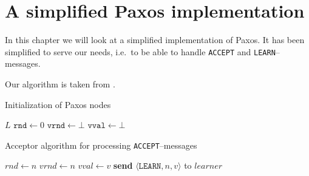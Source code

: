 \chapter{A simplified Paxos implementation}

In this chapter we will look at a simplified implementation of Paxos.
It has been simplified to serve our needs, i.e.~to be able to handle
\texttt{ACCEPT} and \texttt{LEARN}--messages.

Our algorithm is taken from \cite{Insane.Paxos}.


\begin{algorithm}
  \caption{Initialization of Paxos nodes}
  \label{paxos.algorithm.init}
  \begin{algorithmic}
    \State $L$
    \State $\texttt{rnd} \leftarrow 0$ 
    \State $\texttt{vrnd} \leftarrow \bot$ 
    \State $\texttt{vval} \leftarrow \bot$ 
  \end{algorithmic}
\end{algorithm}


\begin{algorithm}
  \caption{Acceptor algorithm for processing \texttt{ACCEPT}--messages}
  \label{paxos.algorithm.acceptor}

  \begin{algorithmic}
        \State $rnd\gets n$
        \State $vrnd\gets n$
        \State $vval\gets v$
           \State \textbf{send} $\langle \texttt{LEARN}, n, v \rangle $ to $learner$
        \EndFor
      \EndIf
    \EndOn

  \end{algorithmic}
\end{algorithm}

